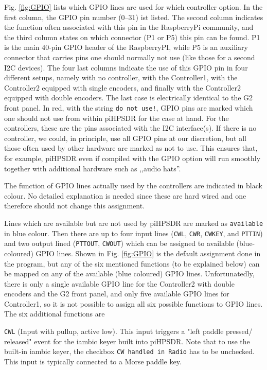 \documentclass[12pt]{book}
\def\rett#1{\texttt{\color{red}#1}}
\def\bltt#1{\texttt{\color{blue}#1}}
\begin{document}
Fig. \ref{fig:GPIO} lists which GPIO lines are used for which controller option. In the first column,
the GPIO pin number (0--31) ist listed. The second column indicates the function often
associated with this pin in the RaspberryPi community, and the third column states on which connector
(P1 or P5) this pin can be found. P1 is the main 40-pin GPIO header of the RaspberryPI, while P5 is
an auxiliary connector that carries pins one should normally not use (like those for a second I2C
devices). The four last columns indicate the use of this GPIO pin in four different setups, namely
with no controller, with the Controller1, with the Controller2 equipped with single encoders, and
finally with the Controller2 equipped with double encoders. The last case is electrically identical to
the G2 front panel. In red, with the string \texttt{do not use!}, GPIO pins are marked which one should
not use from within piHPSDR for the case at hand. For the controllers, these are the pins associated
with the I2C interface(s). If there is no controller, we could, in principle, use all GPIO pins at our
discretion, but all those often used by other hardware are marked as not to use. This ensures that, 
for example, piHPSDR even if compiled with the GPIO option will run smoothly together with additional
hardware such as ,,audio hats''.

The function of GPIO lines actually used by the controllers are indicated in black colour. No detailed
explanation is needed since these are hard wired and one therefore should not change this assignment.

Lines which are available but are not used by piHPSDR are marked as \texttt{available} in blue colour.
Then there are up to four input lines (\texttt{CWL}, \texttt{CWR}, \texttt{CWKEY}, and \texttt{PTTIN})
and two output lined (\texttt{PTTOUT}, \texttt{CWOUT}) which can be assigned to available (blue-coloured)
GPIO lines. Shown in Fig. \ref{fig:GPIO} is the default assignment done in the program, but any of the
six mentioned functions (to be explained below) can be mapped on any of the available (blue coloured)
GPIO lines. Unfortunatedly, there is only a single available GPIO line for the Controller2 with double
encoders and the G2 front panel, and only five available GPIO lines for Controller1, so it is not possible
to assign all six possible functions to GPIO lines. The six additional functions are

\rett{CWL} (Input with pullup, active low). This input triggers a "left paddle pressed/
released" event for the
iambic keyer built into piHPSDR. Note that to use the built-in iambic keyer, the checkbox 
\bltt{CW handled in Radio} has to be unchecked. This input is typically connected to
a Morse paddle key.
\end{document}
